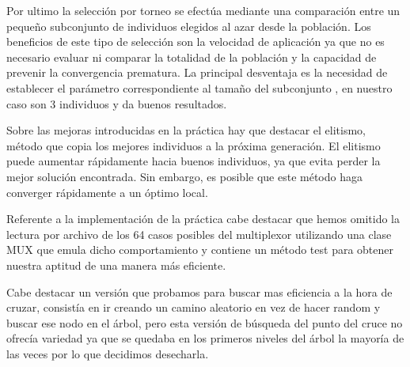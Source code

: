 \documentclass[12pt]{article}
\begin{document}
Por ultimo la selección por torneo se efectúa mediante una comparación entre un pequeño subconjunto de individuos elegidos al azar desde la población.
Los beneficios de este tipo de selección son la velocidad de aplicación ya que no es necesario evaluar ni comparar la totalidad de la población y la capacidad de prevenir la convergencia prematura. La principal desventaja es la necesidad de establecer el parámetro correspondiente al tamaño del subconjunto , en nuestro caso son 3 individuos y da buenos resultados.

Sobre las mejoras introducidas en la práctica hay que destacar el elitismo, método que copia los mejores individuos a la
próxima generación. El elitismo puede aumentar rápidamente hacia buenos individuos, ya que evita perder la mejor solución encontrada. Sin embargo,
es posible que este método haga converger rápidamente a un óptimo local.

Referente a la implementación de la práctica cabe destacar que hemos omitido la lectura por archivo de los 64 casos posibles del multiplexor utilizando una clase MUX que emula dicho comportamiento y contiene un método test para obtener nuestra aptitud de una manera más eficiente.

Cabe destacar un versión que probamos para buscar mas eficiencia a la hora de cruzar, consistía en ir creando un camino aleatorio en vez de hacer random y buscar ese nodo en el árbol, pero esta versión de búsqueda del punto del cruce no ofrecía variedad ya que se quedaba en los primeros niveles del árbol la mayoría de las veces por lo que decidimos desecharla.
\end{document}
